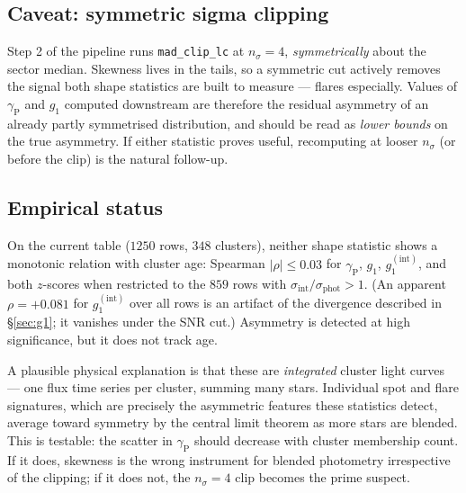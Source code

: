 \documentclass[11pt]{article}
\newcommand{\gp}{\gamma_{\mathrm{P}}}
\newcommand{\sigphot}{\sigma_{\mathrm{phot}}}
\newcommand{\sigint}{\sigma_{\mathrm{int}}}
\begin{document}
\subsection{Caveat: symmetric sigma clipping}

Step 2 of the pipeline runs \texttt{mad\_clip\_lc} at $n_\sigma = 4$,
\emph{symmetrically} about the sector median. Skewness lives in the tails, so a
symmetric cut actively removes the signal both shape statistics are built to
measure --- flares especially. Values of $\gp$ and $g_1$ computed downstream are
therefore the residual asymmetry of an already partly symmetrised distribution,
and should be read as \emph{lower bounds} on the true asymmetry. If either
statistic proves useful, recomputing at looser $n_\sigma$ (or before the clip) is
the natural follow-up.

\subsection{Empirical status}

On the current table ($1250$ rows, $348$ clusters), neither shape statistic shows
a monotonic relation with cluster age: Spearman $|\rho| \le 0.03$ for $\gp$,
$g_1$, $g_1^{\mathrm{(int)}}$, and both $z$-scores when restricted to the $859$
rows with $\sigint/\sigphot > 1$. (An apparent $\rho = +0.081$ for
$g_1^{\mathrm{(int)}}$ over all rows is an artifact of the divergence described
in \S\ref{sec:g1}; it vanishes under the SNR cut.) Asymmetry is detected at high
significance, but it does not track age.

A plausible physical explanation is that these are \emph{integrated} cluster
light curves --- one flux time series per cluster, summing many stars. Individual
spot and flare signatures, which are precisely the asymmetric features these
statistics detect, average toward symmetry by the central limit theorem as more
stars are blended. This is testable: the scatter in $\gp$ should decrease with
cluster membership count. If it does, skewness is the wrong instrument for
blended photometry irrespective of the clipping; if it does not, the $n_\sigma=4$
clip becomes the prime suspect.
\end{document}
